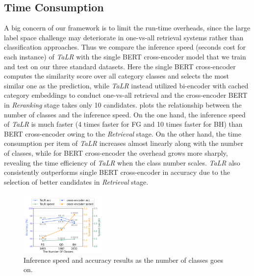 \subsection{Time Consumption}
\label{sec:time cons}
A big concern of our framework is to limit the run-time overheads, since the large label space challenge may deteriorate in one-vs-all retrieval systems rather than classification approaches.  
Thus we compare the inference speed (seconds cost for each instance) of \textit{TaLR} with the single BERT cross-encoder model that we train and test on our three standard datasets. Here the single BERT cross-encoder computes the similarity score over all category classes and selects the most similar one as the prediction, while \textit{TaLR} instead utilized bi-encoder with cached category embeddings to conduct one-vs-all retrieval and the cross-encoder BERT in \textit{Reranking} stage takes only 10 candidates. 
 plots the relationship between the number of classes and the inference speed. On the one hand, the inference speed of \textit{TaLR} is much faster (4 times faster for FG and 10 times faster for BH) than BERT cross-encoder owing to the \textit{Retrieval} stage. On the other hand, the time consumption per item of \textit{TaLR} increases almost linearly along with the number of classes, while for BERT cross-encoder the overhead grows more sharply, revealing the time efficiency of \textit{TaLR} when the class number scales. 
\textit{TaLR} also consistently outperforms single BERT cross-encoder in accuracy due to the selection of better candidates in \textit{Retrieval} stage. 

\begin{figure}[thbp] \centering
    \includegraphics[width=0.38\textwidth]{time.pdf}
    \caption{Inference speed and accuracy results as the number of classes goes on.} 
    \label{fig:time}
\end{figure}

